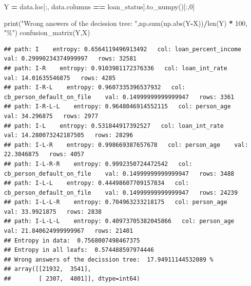 \documentclass[
]{book}
\newenvironment{Shaded}{\begin{snugshade}}{\end{snugshade}}
\newcommand{\BuiltInTok}[1]{#1}
\newcommand{\DecValTok}[1]{\textcolor[rgb]{0.00,0.00,0.81}{#1}}
\newcommand{\NormalTok}[1]{#1}
\newcommand{\OperatorTok}[1]{\textcolor[rgb]{0.81,0.36,0.00}{\textbf{#1}}}
\newcommand{\StringTok}[1]{\textcolor[rgb]{0.31,0.60,0.02}{#1}}
\begin{document}
\begin{Shaded}
\begin{Highlighting}[]
\NormalTok{Y }\OperatorTok{=}\NormalTok{ data.loc[:, data.columns }\OperatorTok{==} \StringTok{\textquotesingle{}loan\_status\textquotesingle{}}\NormalTok{].to\_numpy()[:,}\DecValTok{0}\NormalTok{]}

\BuiltInTok{print}\NormalTok{(}\StringTok{"Wrong answers of the decission tree: "}\NormalTok{,np.}\BuiltInTok{sum}\NormalTok{(np.}\BuiltInTok{abs}\NormalTok{(Y}\OperatorTok{{-}}\NormalTok{X))}\OperatorTok{/}\BuiltInTok{len}\NormalTok{(Y) }\OperatorTok{*} \DecValTok{100}\NormalTok{, }\StringTok{"\%"}\NormalTok{)}
\NormalTok{confusion\_matrix(Y,X)}
\end{Highlighting}
\end{Shaded}

\begin{verbatim}
## path: I    entropy: 0.6564119496913492   col: loan_percent_income    val: 0.29990234374999997   rows: 32581
## path: I-R    entropy: 0.9103981172376336   col: loan_int_rate    val: 14.01635546875   rows: 4285
## path: I-R-L    entropy: 0.9607335396537932   col: cb_person_default_on_file    val: 0.14999999999999947   rows: 3361
## path: I-R-L-L    entropy: 0.9648046914552115   col: person_age    val: 34.296875   rows: 2977
## path: I-L    entropy: 0.531844917392527   col: loan_int_rate    val: 14.280073242187505   rows: 28296
## path: I-L-R    entropy: 0.998669387657678   col: person_age    val: 22.3046875   rows: 4057
## path: I-L-R-R    entropy: 0.9992350724472542   col: cb_person_default_on_file    val: 0.14999999999999947   rows: 3488
## path: I-L-L    entropy: 0.44498607709157834   col: cb_person_default_on_file    val: 0.14999999999999947   rows: 24239
## path: I-L-L-R    entropy: 0.704963233218175   col: person_age    val: 33.9921875   rows: 2838
## path: I-L-L-L    entropy: 0.40973705382045866   col: person_age    val: 21.840624999999967   rows: 21401
## Entropy in data:  0.7568007498467375
## Entropy in all leafs:  0.574488597974446
## Wrong answers of the decission tree:  17.94911144532089 %
## array([[21932,  3541],
##        [ 2307,  4801]], dtype=int64)
\end{verbatim}

  
\end{document}
